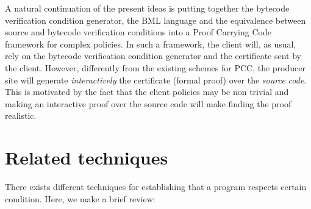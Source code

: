 A natural continuation of the present ideas is putting together the bytecode verification condition generator, 
	 the  BML language and the equivalence between source and bytecode verification conditions into a Proof Carrying Code framework for complex policies.
	 In such a framework, the client
	 will, as usual, rely  on the bytecode verification condition generator and  the certificate sent by the client. 
	 However, differently from the existing schemes for PCC, the producer site will generate \textit{interactively} the certificate (formal proof) 
	 over the \textit{source code}. This is motivated by the fact that the client policies may be non trivial and making an interactive proof over the source
	 code will make finding the proof realistic.
\section{Related techniques}

There exists different techniques for establishing that a program respects certain condition. Here, we make a brief review:

